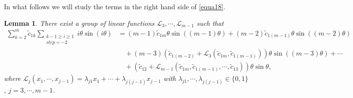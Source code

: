\documentclass[11pt]{amsart}
\newtheorem{lem}[thm]{Lemma}
\theoremstyle{remark}
\theoremstyle{definition}
\begin{document}
In what follows we will study the terms in the right hand side of \eqref{equa18}.



\begin{lem} \label{lem4} There exist a group of linear functions $ \mathcal{L}_3,\cdots, \mathcal{L}_{m-1}$ such that
\begin{equation*} \label{equa20}
\begin{split}
\sum_{k=2}^{m}\tilde{c}_{1k}\sum_{\substack{k-1\geq i\geq 1\\ step=-2}}i\theta\sin(i\theta)&=(m-1)\tilde{c}_{1m}\theta\sin((m-1)\theta) +(m-2)\tilde{c}_{1(m-1)}\theta\sin((m-2)\theta)\\
&\quad +(m-3)\left(\tilde{c}_{1(m-2)}+\mathcal{L}_3(\tilde{c}_{1m},\tilde{c}_{1(m-1)})\right)\theta\sin((m-3)\theta)
 +\cdots\\
&\quad +\left(\tilde{c}_{12}+\mathcal{L}_{m-1}(\tilde{c}_{1m},\tilde{c}_{1(m-1)},\cdots,\tilde{c}_{13})\right)\theta\sin\theta,
 \end{split}\end{equation*}
where $\mathcal{L}_j(x_1, \cdots, x_{j-1})=\lambda_{j1}x_1+\cdots +\lambda_{j(j-1)}x_{j-1}$ with $\lambda_{j1},\cdots,\lambda_{j(j-1)}\in \{0, 1\}$,    $j=3,\cdots, m-1$.
\end{lem}
\end{document}
